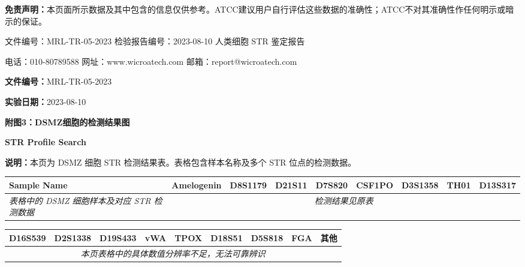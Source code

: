 \documentclass[UTF8,10pt,a4paper,fontset=fandol]{ctexart}
\begin{document}
\medskip

\noindent
\textbf{免责声明：}本页面所示数据及其中包含的信息仅供参考。ATCC建议用户自行评估这些数据的准确性；ATCC不对其准确性作任何明示或暗示的保证。

\medskip

\noindent
文件编号：MRL-TR-05-2023 \hfill 检验报告编号：2023-08-10 人类细胞 STR 鉴定报告

\noindent
电话：010-80789588 \hfill 网址：www.wicroatech.com \hfill 邮箱：report@wicroatech.com


\newpage

\noindent
\textbf{文件编号：}MRL-TR-05-2023

\noindent
\textbf{实验日期：}2023-08-10

\begin{center}
\textbf{附图3：DSMZ细胞的检测结果图}
\end{center}

\begin{center}
\textbf{STR Profile Search}
\end{center}

\noindent
\textbf{说明：}本页为 DSMZ 细胞 STR 检测结果表。表格包含样本名称及多个 STR 位点的检测数据。

\vspace{0.5em}

\begin{center}
\scriptsize
\begin{tabular}{|p{2.2cm}|p{1.25cm}|p{1.25cm}|p{1.25cm}|p{1.25cm}|p{1.25cm}|p{1.25cm}|p{1.25cm}|p{1.25cm}|}
\hline
\textbf{Sample Name} &
\textbf{Amelogenin} &
\textbf{D8S1179} &
\textbf{D21S11} &
\textbf{D7S820} &
\textbf{CSF1PO} &
\textbf{D3S1358} &
\textbf{TH01} &
\textbf{D13S317}
\\ \hline
\textit{表格中的 DSMZ 细胞样本及对应 STR 检测数据} &
\multicolumn{8}{c|}{\textit{检测结果见原表}} 
\\ \hline
\end{tabular}
\end{center}

\vspace{0.5em}

\begin{center}
\scriptsize
\begin{tabular}{|p{1.25cm}|p{1.25cm}|p{1.25cm}|p{1.25cm}|p{1.25cm}|p{1.25cm}|p{1.25cm}|p{1.25cm}|p{1.25cm}|}
\hline
\textbf{D16S539} &
\textbf{D2S1338} &
\textbf{D19S433} &
\textbf{vWA} &
\textbf{TPOX} &
\textbf{D18S51} &
\textbf{D5S818} &
\textbf{FGA} &
\textbf{其他}
\\ \hline
\multicolumn{9}{c|}{\textit{本页表格中的具体数值分辨率不足，无法可靠辨识}}
\\ \hline
\end{tabular}
\end{center}
\end{document}
